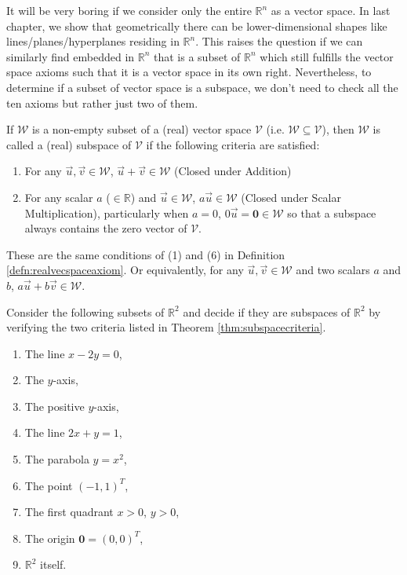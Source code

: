 It will be very boring if we consider only the entire $\mathbb{R}^n$ as a vector space. In last chapter, we show that geometrically there can be lower-dimensional shapes like lines/planes/hyperplanes residing in $\mathbb{R}^n$. This raises the question if we can similarly find  embedded in $\mathbb{R}^n$ that is a subset of $\mathbb{R}^n$ which still fulfills the vector space axioms such that it is a vector space in its own right. Nevertheless, to determine if a subset of vector space is a subspace, we don't need to check all the ten axioms but rather just two of them.
\begin{thm}
\label{thm:subspacecriteria}
If $\mathcal{W}$ is a non-empty subset of a (real) vector space $\mathcal{V}$ (i.e. $\mathcal{W} \subseteq \mathcal{V}$), then $\mathcal{W}$ is called a (real) subspace of $\mathcal{V}$ if the following criteria are satisfied:
\begin{enumerate}
\item For any $\vec{u}, \vec{v} \in \mathcal{W}$, $\vec{u} + \vec{v} \in \mathcal{W}$ (Closed under Addition)
\item For any scalar $a$ ($\in \mathbb{R}$) and $\vec{u} \in \mathcal{W}$, $a\vec{u} \in \mathcal{W}$ (Closed under Scalar Multiplication), particularly when $a = 0$, $0\vec{u} = \textbf{0} \in \mathcal{W}$ so that a subspace always contains the zero vector of $\mathcal{V}$.
\end{enumerate}
These are the same conditions of (1) and (6) in Definition \ref{defn:realvecspaceaxiom}. Or equivalently, for any $\vec{u}, \vec{v} \in \mathcal{W}$ and two scalars $a$ and $b$, $a\vec{u} + b\vec{v} \in \mathcal{W}$.
\end{thm}
\begin{exmp}
Consider the following subsets of $\mathbb{R}^2$ and decide if they are subspaces of $\mathbb{R}^2$ by verifying the two criteria listed in Theorem \ref{thm:subspacecriteria}.
\begin{enumerate}[label=(\alph*)]
\item The line $x - 2y = 0$,
\item The $y$-axis,
\item The positive $y$-axis,
\item The line $2x + y = 1$,
\item The parabola $y = x^2$,
\item The point $(-1,1)^T$,
\item The first quadrant $x > 0$, $y > 0$,
\item The origin $\textbf{0} = (0,0)^T$,
\item $\mathbb{R}^2$ itself.
\end{enumerate}
\end{exmp}
